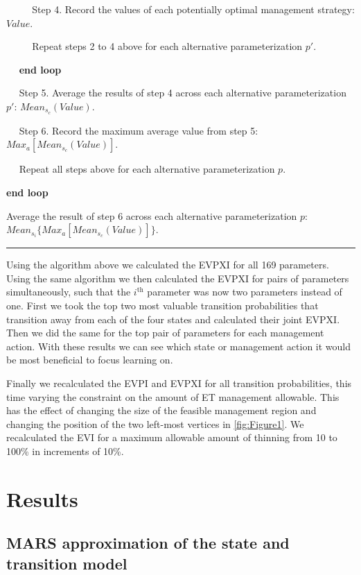 \documentclass[draft]{article}
\theoremstyle{definition}
\theoremstyle{definition}
\theoremstyle{definition}
\theoremstyle{remark}
\begin{document}
\(\quad\) \(\quad\) Step 4. Record the values of each potentially
optimal management strategy: \(Value\).

\(\quad\) \(\quad\) Repeat steps 2 to 4 above for each alternative
parameterization \(p'\).

\(\quad\) \textbf{end loop}

\(\quad\) Step 5. Average the results of step 4 across each alternative
parameterization \(p'\): \(Mean_{s_c}(Value)\).

\(\quad\) Step 6. Record the maximum average value from step 5:
\(Max_a[Mean_{s_c}(Value)]\).

\(\quad\) Repeat all steps above for each alternative parameterization
\(p\).

\textbf{end loop}

Average the result of step 6 across each alternative parameterization
\(p\): \(Mean_{s_i}\{Max_a[Mean_{s_c}(Value)]\}\).

\begin{center}\rule{0.5\linewidth}{\linethickness}\end{center}

Using the algorithm above we calculated the EVPXI for all 169
parameters. Using the same algorithm we then calculated the EVPXI for
pairs of parameters simultaneously, such that the \(i^\mathrm{th}\)
parameter was now two parameters instead of one. First we took the top
two most valuable transition probabilities that transition away from
each of the four states and calculated their joint EVPXI. Then we did
the same for the top pair of parameters for each management action. With
these results we can see which state or management action it would be
most beneficial to focus learning on.

Finally we recalculated the EVPI and EVPXI for all transition
probabilities, this time varying the constraint on the amount of ET
management allowable. This has the effect of changing the size of the
feasible management region and changing the position of the two
left-most vertices in \ref{fig:Figure1}. We recalculated the EVI for a
maximum allowable amount of thinning from 10 to 100\% in increments of
10\%.

\section*{Results}\label{results}

\subsection*{MARS approximation of the state and transition
model}\label{mars-approximation-of-the-state-and-transition-model}
\end{document}
